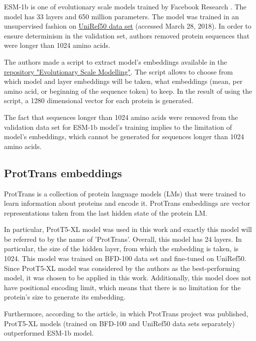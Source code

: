 \documentclass[12pt]{article}
\begin{document}
	ESM-1b is one of evolutionary scale models trained by Facebook Research 
	\cite{rives2021biological}. The model has 33 layers and 650 million parameters. 
	The model was trained in an 
	unsupervised fashion on 
	\href{ftp://ftp.uniprot.org/pub/databases/uniprot/uniref/uniref50}{UniRef50 data set}
	(accessed March 28, 2018)\cite{suzek2015uniref}. In order 
	to ensure
	determinism in the validation set, authors removed protein sequences that
	were longer than 1024 amino acids. 

	The authors made a script to extract model's embeddings available in the 
	\href{https://github.com/facebookresearch/esm}{repository "Evolutionary Scale Modelling"}.
	The script allows to choose 
	from which model and layer embeddings will be taken, what embeddings 
	(mean, per amino acid, or beginning of the sequence token) to keep. In the
	result of using the script, a 1280 dimensional vector for each protein is 
	generated.
	
	The fact that sequences longer than 1024 amino acids were removed from the 
	validation data set for ESM-1b model's training implies to the limitation of 
	model's embeddings, which cannot be generated for sequences longer than 
	1024 amino acids.

	\subsection{ProtTrans embeddings}

	ProtTrans \cite{elnaggar2020prottrans} is a collection 
	of protein language models 
	(LMs) that were trained to learn information about 
	proteins and encode it. ProtTrans embeddings are vector 
	representations taken from the last hidden state of 
	the protein LM. 

	In particular, ProtT5-XL model was used in this work and 
	exactly this model will be referred to by the name of 
	'ProtTrans'. Overall, this model has 24 layers. In particular, 
	the size of the hidden layer, from which the 
	embedding is taken, is 1024. This model was trained on 
	BFD-100 data set 
	and fine-tuned on UniRef50. Since ProtT5-XL model was 
	considered by the 
	authors as the best-performing model, it was chosen to be 
	applied in this work. Additionally, this model 
	does not have 
	positional encoding limit, which means that there is no 
	limitation for the protein's size to generate its embedding. 

	Furthermore, according to the article, in which ProtTrans
	project was published, ProtT5-XL models (trained on BFD-100 
	and UniRef50 data sets separately) 
	outperformed ESM-1b \cite{rives2021biological} model.
\end{document}
